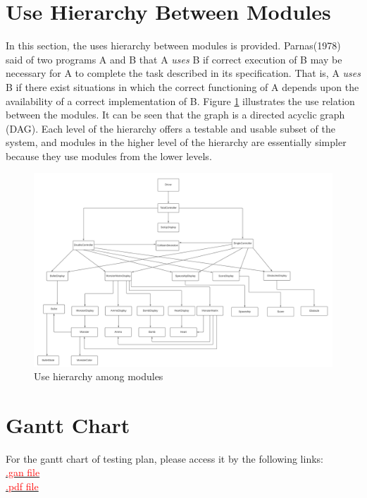 \documentclass[12pt]{article}
\begin{document}
\section{Use Hierarchy Between Modules} \label{SecUse}
In this section, the uses hierarchy between modules is
provided. Parnas(1978) said of two programs A and B that A {\em uses} B if
correct execution of B may be necessary for A to complete the task described in
its specification. That is, A {\em uses} B if there exist situations in which
the correct functioning of A depends upon the availability of a correct
implementation of B.  Figure \ref{FigUH} illustrates the use relation between
the modules. It can be seen that the graph is a directed acyclic graph
(DAG). Each level of the hierarchy offers a testable and usable subset of the
system, and modules in the higher level of the hierarchy are essentially simpler
because they use modules from the lower levels.

\begin{figure}[h!]
\centering
\includegraphics[scale = 0.35]{USE_H2.png}
\caption{Use hierarchy among modules}
\label{FigUH}
\end{figure}

\section{Gantt Chart}
For the gantt chart of testing plan, please access it by the 
following links:\\
\href{https://gitlab.cas.mcmaster.ca/shit19/2022_winter_3xa3_l03_g07/-/blob/main/ProjectSchedule/Gantt_Project_Design_Finished.gan}{\textcolor{red}{.gan file}}
\\
\href{https://gitlab.cas.mcmaster.ca/shit19/2022_winter_3xa3_l03_g07/-/blob/main/ProjectSchedule/Gantt_Project_Design_Finished.pdf}{\textcolor{red}{.pdf file}}
\end{document}
